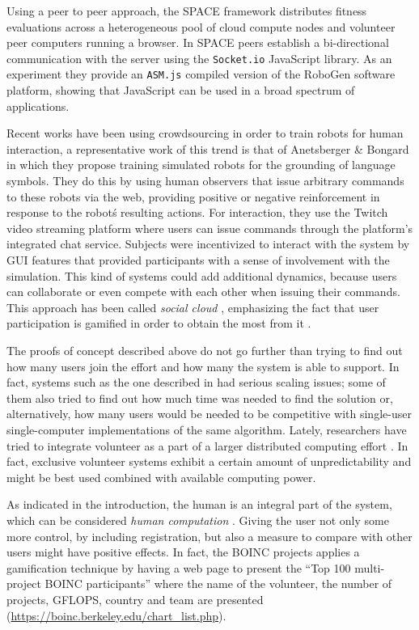\documentclass{llncs}
\begin{document}
Using a peer to peer approach, the SPACE framework \cite{leclerc2016seamless} distributes fitness 
evaluations across a heterogeneous pool of cloud compute nodes and volunteer
peer computers running a browser. In SPACE peers establish a bi-directional 
communication with the server using the \texttt{Socket.io} JavaScript library.  
As an experiment they provide an \texttt{ASM.js} compiled version of the RoboGen 
software platform, showing that JavaScript can be used in a broad 
spectrum of applications.  

Recent works have been using crowdsourcing in order to train robots 
for human interaction, a representative work of this trend is that of  
Anetsberger \& Bongard \cite{anetsbergerrobots} in which they propose 
training simulated robots for the grounding of language symbols. They do this by using human 
observers that issue arbitrary commands to these robots via the web, 
providing positive or negative reinforcement in response to the
robot\'s resulting actions. For interaction, they use the Twitch 
video streaming platform where users can issue commands through the
platform's integrated chat service. Subjects were incentivized to 
interact with the system by GUI features that provided participants
with a sense of involvement with the simulation. This kind of systems
could add additional dynamics, because users can collaborate or 
even compete with each other when issuing their commands. This approach has been called {\em social cloud} \cite{6404452}, emphasizing the fact that user participation is gamified in order to obtain the most from it \cite{7027564}. 

The proofs of concept described above do not go further than trying to
find out  how many users join the effort and how many the system is
able to support. In fact, systems such as the one described in
\cite{gecco07:workshop:dcor} had serious scaling issues; some of them
also tried to find out how much time was needed to find the solution
or, alternatively, how many users would be needed to be competitive
with single-user single-computer implementations of the same
algorithm. Lately, researchers have tried to integrate volunteer as a part of a larger distributed computing effort \cite{leclerc2016seamless}. In fact, exclusive volunteer systems exhibit a certain amount of unpredictability and might be best used combined with available computing power.  

As indicated in the introduction, the human is an integral part of the system, which can be considered {\em human computation} \cite{quinn2011human}. Giving the user not only some more control, by including registration, but also a measure to compare with other users might have positive effects. In fact, the BOINC projects applies a gamification technique 
by having a web page to present the ``Top 100 multi-project BOINC participants'' where
the name of the volunteer, the number of projects, GFLOPS, country and team are presented 
(\url{https://boinc.berkeley.edu/chart_list.php}). 
\end{document}
